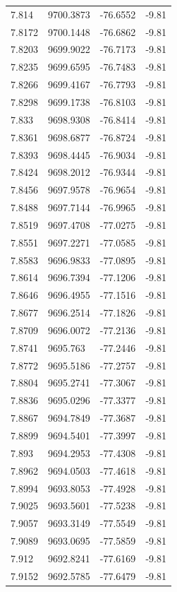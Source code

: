 \begin{table}[H]
\begin{tabular}{llll}
7.814 & 9700.3873 & -76.6552 & -9.81 \\
7.8172 & 9700.1448 & -76.6862 & -9.81 \\
7.8203 & 9699.9022 & -76.7173 & -9.81 \\
7.8235 & 9699.6595 & -76.7483 & -9.81 \\
7.8266 & 9699.4167 & -76.7793 & -9.81 \\
7.8298 & 9699.1738 & -76.8103 & -9.81 \\
7.833 & 9698.9308 & -76.8414 & -9.81 \\
7.8361 & 9698.6877 & -76.8724 & -9.81 \\
7.8393 & 9698.4445 & -76.9034 & -9.81 \\
7.8424 & 9698.2012 & -76.9344 & -9.81 \\
7.8456 & 9697.9578 & -76.9654 & -9.81 \\
7.8488 & 9697.7144 & -76.9965 & -9.81 \\
7.8519 & 9697.4708 & -77.0275 & -9.81 \\
7.8551 & 9697.2271 & -77.0585 & -9.81 \\
7.8583 & 9696.9833 & -77.0895 & -9.81 \\
7.8614 & 9696.7394 & -77.1206 & -9.81 \\
7.8646 & 9696.4955 & -77.1516 & -9.81 \\
7.8677 & 9696.2514 & -77.1826 & -9.81 \\
7.8709 & 9696.0072 & -77.2136 & -9.81 \\
7.8741 & 9695.763 & -77.2446 & -9.81 \\
7.8772 & 9695.5186 & -77.2757 & -9.81 \\
7.8804 & 9695.2741 & -77.3067 & -9.81 \\
7.8836 & 9695.0296 & -77.3377 & -9.81 \\
7.8867 & 9694.7849 & -77.3687 & -9.81 \\
7.8899 & 9694.5401 & -77.3997 & -9.81 \\
7.893 & 9694.2953 & -77.4308 & -9.81 \\
7.8962 & 9694.0503 & -77.4618 & -9.81 \\
7.8994 & 9693.8053 & -77.4928 & -9.81 \\
7.9025 & 9693.5601 & -77.5238 & -9.81 \\
7.9057 & 9693.3149 & -77.5549 & -9.81 \\
7.9089 & 9693.0695 & -77.5859 & -9.81 \\
7.912 & 9692.8241 & -77.6169 & -9.81 \\
7.9152 & 9692.5785 & -77.6479 & -9.81 \\

\end{tabular}
\end{table}
